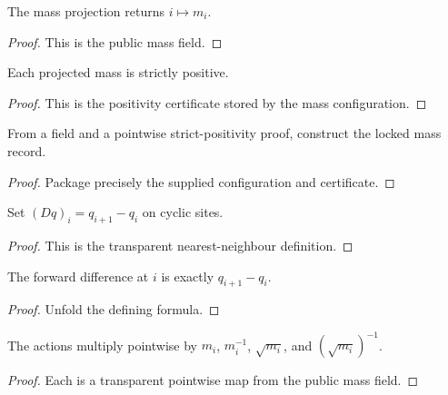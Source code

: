 \begin{definition}
\label{def:lattice:mass}
The mass projection returns $i\mapsto m_i$.
\end{definition}
\begin{proof}This is the public mass field.\end{proof}

\begin{theorem}
\label{thm:lattice:mass-pos}
Each projected mass is strictly positive.
\end{theorem}
\begin{proof}This is the positivity certificate stored by the mass configuration.\end{proof}

\begin{definition}
\label{def:lattice:positive-mass-mk}
From a field and a pointwise strict-positivity proof, construct the locked mass record.
\end{definition}
\begin{proof}Package precisely the supplied configuration and certificate.\end{proof}

\begin{definition}
\label{def:lattice:forward-difference}
Set $(Dq)_i=q_{i+1}-q_i$ on cyclic sites.
\end{definition}
\begin{proof}\leanok
This is the transparent nearest-neighbour definition.\end{proof}

\begin{theorem}
\label{thm:lattice:forward-difference-apply}
The forward difference at $i$ is exactly $q_{i+1}-q_i$.
\end{theorem}
\begin{proof}\leanok
Unfold the defining formula.\end{proof}

\begin{definition}
\label{def:lattice:mass-actions}
The actions multiply pointwise by $m_i$, $m_i^{-1}$, $\sqrt{m_i}$, and $(\sqrt{m_i})^{-1}$.
\end{definition}
\begin{proof}\leanok
Each is a transparent pointwise map from the public mass field.\end{proof}

